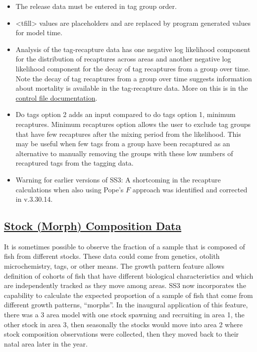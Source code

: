\begin{itemize}
	\item The release data must be entered in tag group order.
	\item <tfill> values are placeholders and are replaced by program generated values for model time.
	\item Analysis of the tag-recapture data has one negative log likelihood component for the distribution of recaptures across areas and another negative log likelihood component for the decay of tag recaptures from a group over time. Note the decay of tag recaptures from a group over time suggests information about mortality is available in the tag-recapture data. More on this is in the \hyperlink{tagrecapture}{control file documentation}.
	\item  Do tags option 2 adds an input compared to do tags option 1, minimum recaptures. Minimum recaptures option allows the user to exclude tag groups that have few recaptures after the mixing period from the likelihood. This may be useful when few tags from a group have been recaptured as an alternative to manually removing the groups with these low numbers of recaptured tags from the tagging data.
	\item Warning for earlier versions of SS3: A shortcoming in the recapture calculations when also using Pope's $F$ approach was identified and corrected in v.3.30.14.
\end{itemize}

\hypertarget{StockComp}{}
\subsection[Stock (Morph) Composition Data]{\protect\hyperlink{StockComp}{Stock (Morph) Composition Data}}
It is sometimes possible to observe the fraction of a sample that is composed of fish from different stocks. These data could come from genetics, otolith microchemistry, tags, or other means. The growth pattern feature allows definition of cohorts of fish that have different biological characteristics and which are independently tracked as they move among areas. SS3 now incorporates the capability to calculate the expected proportion of a sample of fish that come from different growth patterns, ``morphs''. In the inaugural application of this feature, there was a 3 area model with one stock spawning and recruiting in area 1, the other stock in area 3, then seasonally the stocks would move into area 2 where stock composition observations were collected, then they moved back to their natal area later in the year.

